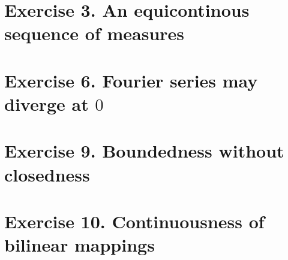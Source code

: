 \section{Exercise 3. An equicontinous sequence of measures}

\section{Exercise 6. Fourier series may diverge at $0$}

\section{Exercise 9. Boundedness without closedness}

\newpage
\section{Exercise 10. Continuousness of bilinear mappings}

%